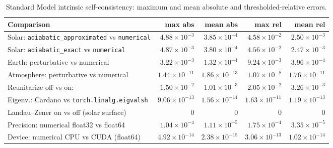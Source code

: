 \begin{table}[htbp]
  \centering
  \footnotesize
  \caption{Standard Model intrinsic self-consistency: maximum and mean absolute and thresholded-relative errors.}
  \label{tab:intrinsic-standard-model}
  \begin{tabularx}{\textwidth}{Xrrrr}
    \toprule
    Comparison & max abs & mean abs & max rel & mean rel \\
    \midrule
    Solar: \texttt{adiabatic\_approximated} vs \texttt{numerical} & \(4.88\times10^{-3}\) & \(3.85\times10^{-4}\) & \(4.58\times10^{-2}\) & \(2.50\times10^{-3}\) \\
    Solar: \texttt{adiabatic\_exact} vs \texttt{numerical} & \(4.87\times10^{-3}\) & \(3.80\times10^{-4}\) & \(4.56\times10^{-2}\) & \(2.47\times10^{-3}\) \\
    Earth: perturbative vs numerical & \(3.22\times10^{-3}\) & \(1.32\times10^{-4}\) & \(9.24\times10^{-3}\) & \(3.96\times10^{-4}\) \\
    Atmosphere: perturbative vs numerical & \(1.44\times10^{-11}\) & \(1.86\times10^{-13}\) & \(1.07\times10^{-8}\) & \(1.76\times10^{-11}\) \\
    Reunitarize off vs on: & \(1.50\times10^{-2}\) & \(1.01\times10^{-3}\) & \(2.05\times10^{-2}\) & \(3.26\times10^{-3}\) \\
    Eigenv.: Cardano vs \texttt{torch.linalg.eigvalsh} & \(9.06\times10^{-13}\) & \(1.56\times10^{-14}\) & \(1.63\times10^{-11}\) & \(1.19\times10^{-13}\) \\
    Landau--Zener on vs off (solar surface) & \(0\) & \(0\) & \(0\) & \(0\) \\
    Precision: numerical float32 vs float64 & \(1.04\times10^{-4}\) & \(1.11\times10^{-5}\) & \(1.75\times10^{-4}\) & \(3.35\times10^{-5}\) \\
    Device: numerical CPU vs CUDA (float64) & \(4.92\times10^{-14}\) & \(2.38\times10^{-15}\) & \(3.06\times10^{-13}\) & \(1.02\times10^{-14}\) \\
    \bottomrule
  \end{tabularx}
\end{table}


